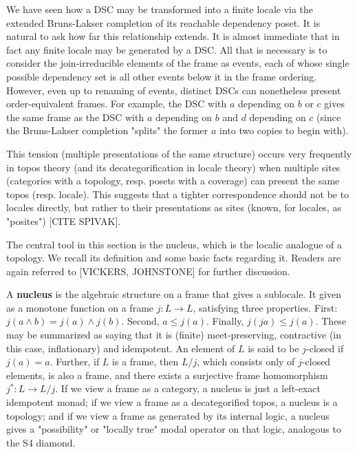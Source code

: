 \documentclass[hoptionsi,review,format=acmsmall]{acmart}
\theoremstyle{definition}
\begin{document}
We have seen how a DSC may be transformed into a finite locale via the extended Bruns-Lakser completion of its reachable dependency poset. It is natural to ask how far this relationship extends. It is almost immediate that in fact any finite locale may be generated by a DSC. All that is necessary is to consider the join-irreducible elements of the frame as events, each of whose single possible dependency set is all other events below it in the frame ordering. However, even up to renaming of events, distinct DSCs can nonetheless present order-equivalent frames. For example, the DSC with \(a\) depending on \(b\) or \(c\) gives the same frame as the DSC with \(a\) depending on \(b\) and \(d\) depending on \(c\) (since the Bruns-Lakser completion "splits" the former \(a\) into two copies to begin with). 

This tension (multiple presentations of the same structure) occurs very frequently in topos theory (and its decategorification in locale theory) when multiple sites (categories with a topology, resp. posets with a coverage) can present the same topos (resp. locale). This suggests that a tighter correspondence should not be to locales directly, but rather to their presentations as sites (known, for locales, as "posites") [CITE SPIVAK].

The central tool in this section is the nucleus, which is the localic analogue of a topology. We recall its definition and some basic facts regarding it. Readers are again referred to [VICKERS, JOHNSTONE] for further discussion.

A \textbf{nucleus} is the algebraic structure on a frame that gives a sublocale. It given as a monotone function on a frame \(j : L \rightarrow L\), satisfying three properties. First: \(j(a \wedge b) = j(a) \wedge j(b)\). Second, \(a \le j(a)\). Finally, \(j(ja) \le j(a)\). These may be summarized as saying that it is (finite) meet-preserving, contractive (in this case, inflationary) and idempotent. An element of \(L\) is said to be \(j\)-closed if \(j(a)=a\). Further, if \(L\) is a frame, then \(L/j\), which consists only of \(j\)-closed elements, is also a frame, and there exists a surjective frame homomorphism \(j^* : L \rightarrow L/j\). If we view a frame as a category, a nucleus is just a left-exact idempotent monad; if we view a frame as a decategorified topos, a nucleus is a topology; and if we view a frame as generated by its internal logic, a nucleus gives a "possibility" or "locally true" modal operator on that logic, analogous to the S4 diamond.
\end{document}
